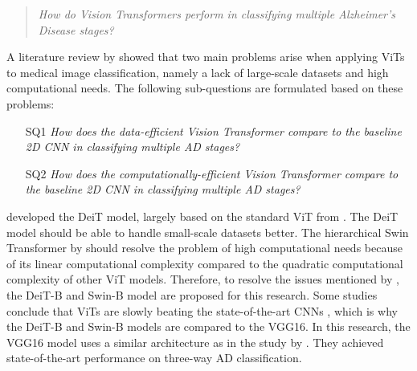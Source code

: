 \documentclass[11pt, a4paper]{article}
\begin{document}
\begin{quote}
\centering
\emph{How do Vision Transformers perform in classifying multiple Alzheimer’s Disease stages?}
\end{quote}

A literature review by \cite{He2022TransformersReview} showed that two main problems arise when applying ViTs to medical image classification, namely a lack of large-scale datasets and high computational needs. The following sub-questions are formulated based on these problems:

\begin{itemize}
\centering
    \item[SQ1] \emph{How does the data-efficient Vision Transformer compare to the baseline 2D CNN in classifying multiple AD stages?}
    \item[SQ2] \emph{How does the computationally-efficient Vision Transformer compare to the baseline 2D CNN in classifying multiple AD stages?}
\end{itemize}

\cite{Touvron2021TrainingAttention} developed the DeiT model, largely based on the standard ViT from \cite{Dosovitskiy2020AnScale}. The DeiT model should be able to handle small-scale datasets better. The hierarchical Swin Transformer by \cite{Liu2021SwinWindows} should resolve the problem of high computational needs because of its linear computational complexity compared to the quadratic computational complexity of other ViT models. Therefore, to resolve the issues mentioned by \cite{He2022TransformersReview}, the DeiT-B and Swin-B model are proposed for this research. Some studies conclude that ViTs are slowly beating the state-of-the-art CNNs \citep{Matsoukas2021IsImages}, which is why the DeiT-B and Swin-B models are compared to the VGG16. In this research, the VGG16 model uses a similar architecture as in the study by \cite{Jain2019ConvolutionalImages}. They achieved state-of-the-art performance on three-way AD classification. 
\end{document}
